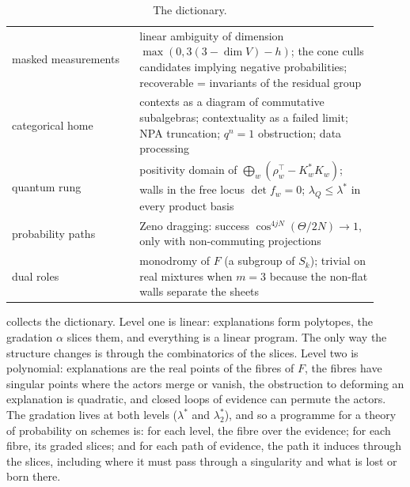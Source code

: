 \documentclass[11pt]{article}
\theoremstyle{definition}\newtheorem{definition}[theorem]{Definition}\newtheorem{remark}[theorem]{Remark}\newtheorem{example}[theorem]{Example}
\begin{document}
\begin{table}[!htbp]
\begin{tabular}{p{0.32\linewidth}p{0.6\linewidth}}
masked measurements & linear ambiguity of dimension $\max(0,3(3-\dim V)-h)$; the cone culls candidates implying negative probabilities; recoverable = invariants of the residual group\\
categorical home & contexts as a diagram of commutative subalgebras; contextuality as a failed limit; NPA truncation; $q^n=1$ obstruction; data processing\\
quantum rung & positivity domain of $\bigoplus_w(\rho_w^\top-K_w^*K_w)$; walls in the free locus $\det f_w=0$; $\lambda_Q\le\lambda^*$ in every product basis\\
probability paths & Zeno dragging: success $\cos^{4jN}(\Theta/2N)\to1$, only with non-commuting projections\\
dual roles & monodromy of $F$ (a subgroup of $S_k$); trivial on real mixtures when $m=3$ because the non-flat walls separate the sheets\\\bottomrule
\end{tabular}
\caption{The dictionary.}\label{tab:dict}
\end{table}

 collects the dictionary. Level one is linear: explanations form polytopes, the gradation $\alpha$ slices them, and
everything is a linear program. The only way the structure changes is through the combinatorics of the slices. Level two is polynomial:
explanations are the real points of the fibres of $F$, the fibres have singular points where the actors merge or vanish, the
obstruction to deforming an explanation is quadratic, and closed loops of evidence can permute the actors. The gradation lives at both
levels ($\lambda^*$ and $\lambda^*_2$), and so a programme for a theory of probability on schemes is: for each level, the fibre over the
evidence; for each fibre, its graded slices; and for each path of evidence, the path it induces through the slices, including where it
must pass through a singularity and what is lost or born there.
\end{document}
